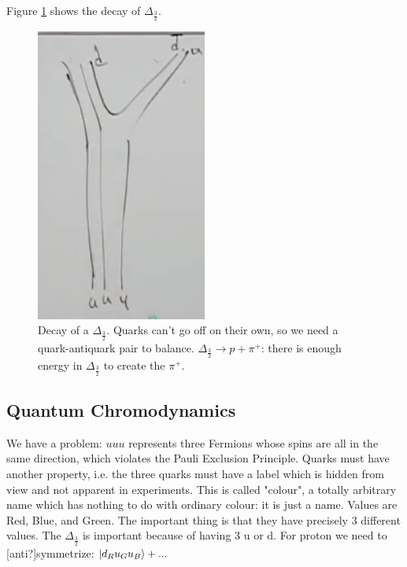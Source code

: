 \documentclass[]{article}
\begin{document}
Figure \ref{fig:decay:delta} shows the decay of $\Delta_\frac{3}{2}$.

\begin{figure}[H]
	\begin{center}
		\caption[Decay of a $\Delta_\frac{3}{2}$]{Decay of a $\Delta_\frac{3}{2}$. Quarks can't go off on their own, so we need a quark-antiquark pair to balance. $\Delta_\frac{3}{2}\rightarrow p +\pi^+$: there is enough energy in $\Delta_\frac{3}{2}$ to create the $\pi^+$.}\label{fig:decay:delta}
		\includegraphics[width=0.5\textwidth]{2-2-Delta-decay}
	\end{center}
\end{figure}

\subsection{Quantum Chromodynamics}

We have a problem: $uuu$ represents three Fermions whose spins are all in the same direction, which violates the Pauli Exclusion Principle. Quarks must have another property, i.e. the three quarks must have a label which is hidden from view and not apparent in experiments. This is called "colour", a totally arbitrary name which has nothing to do with ordinary colour: it is just a name. Values are Red, Blue, and Green. The important thing is that they have precisely 3 different values. The  $\Delta_\frac{3}{2}$ is important because of having 3 u or d. For proton we need to [anti?]symmetrize: $\ket{d_R u_G u_B}+...$
\end{document}
